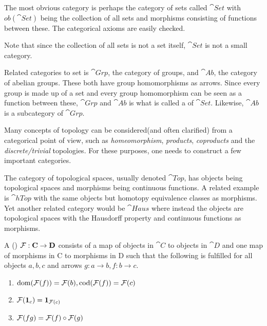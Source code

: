 \documentclass[../../main.tex]{subfiles}
\begin{document}
    \begin{example}
        The most obvious category is perhaps the category of sets called $\cat{Set}$ with $ob(\cat{Set})$ being the collection of all sets and morphisms consisting of functions between these. The categorical axioms are easily checked.
        
        Note that since the collection of all sets is not a set itself, $\cat{Set}$ is not a small category.

        Related categories to set is $\cat{Grp}$, the category of groups, and $\cat{Ab}$, the category of abelian groups. These both have group homomorphisms as arrows. Since every group is made up of a set and every group homomorphism can be seen as a function between these, $\cat{Grp}$ and $\cat{Ab}$ is what is called a  of $\cat{Set}$. Likewise, $\cat{Ab}$ is a subcategory of $\cat{Grp}$.
    \end{example}

    \begin{example}
        Many concepts of topology can be considered(and often clarified) from a categorical point of view, such as \emph{homeomorphism}, \emph{products}, \emph{coproducts} and the \emph{discrete/trivial} topologies. For these purposes, one needs to construct a few important categories.
        
        The category of topological spaces, usually denoted $\cat{Top}$, has objects being topological spaces and morphisms being continuous functions. A related example is $\cat{hTop}$ with the same objects but homotopy equivalence classes as morphisms. Yet another related category would be $\cat{Haus}$ where instead the objects are topological spaces with the Hausdorff property and continuous functions as morphisms.
    \end{example}

    \begin{definition}
        A ()  $\functor{F}: \cat{C} \to \cat{D}$ consists of a map of objects in $\cat{C}$ to objects in $\cat{D}$ and one map of morphisms in C to morphisms in D such that the following is fulfilled for all objects $a, b, c$ and arrows $g: a \to b, f: b \to c$.
        
        \begin{enumerate}
            \item $\domain{\functor{F}(f)} = \functor{F}(b), \codomain{\functor{F}(f)} = \functor{F}(c)$ \label{covar1}
            \item $\functor{F}(\idarrow[c]) = \idarrow[\functor{F}(c)]$
            \item $\functor{F}(fg) = \functor{F}(f) \circ \functor{F}(g)$ \label{covar2}
        \end{enumerate}
    \end{definition}
\end{document}
